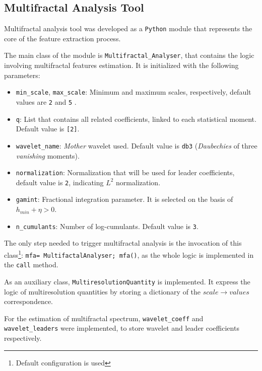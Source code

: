\documentclass{article}
\begin{document}
\subsection{Multifractal Analysis Tool}

Multifractal analysis tool was developed as a \lstinline|Python| module that represents the core of the feature extraction process. 

The main class of the module is \lstinline|Multifractal_Analyser|, that contains the logic involving multifractal features estimation. It is initialized with the following parameters:

\begin{itemize}
	\item \lstinline|min_scale|, \lstinline|max_scale|: Minimum and maximum scales, respectively, default values are \lstinline|2| and \lstinline|5| . 
	\item \lstinline|q|: List that contains all related coefficients, linked to each statistical moment. Default value is \lstinline|[2]|.
	\item \lstinline|wavelet_name|: \textit{Mother} wavelet used. Default value is \lstinline|db3| (\textit{Daubechies} of three \textit{vanishing} moments).
	\item \lstinline|normalization|: Normalization that will be used for leader coefficients, default value is \lstinline|2|, indicating $L^2$ normalization.
	\item \lstinline|gamint|: Fractional integration parameter. It is selected on the basis of $h_{min}+ \eta > 0$.
	\item \lstinline|n_cumulants|: Number of log-cumulants. Default value is \lstinline|3|.
\end{itemize}

The only step needed to trigger multifractal analysis is the invocation of this class\footnote{Default configuration is used}: \lstinline|mfa= MultifactalAnalyser; mfa()|, as the whole logic is implemented in the \underline{\hspace{0.5cm}}\lstinline|call|\underline{\hspace{0.5cm}} method.

As an auxiliary class,  \lstinline|MultiresolutionQuantity| is implemented. It express the logic of multiresolution quantities by storing a dictionary of the $scale \rightarrow values$ correspondence.  

For the estimation of multifractal spectrum, \lstinline|wavelet_coeff| and \lstinline|wavelet_leaders| were implemented, to store wavelet and leader coefficients respectively. 
\end{document}
